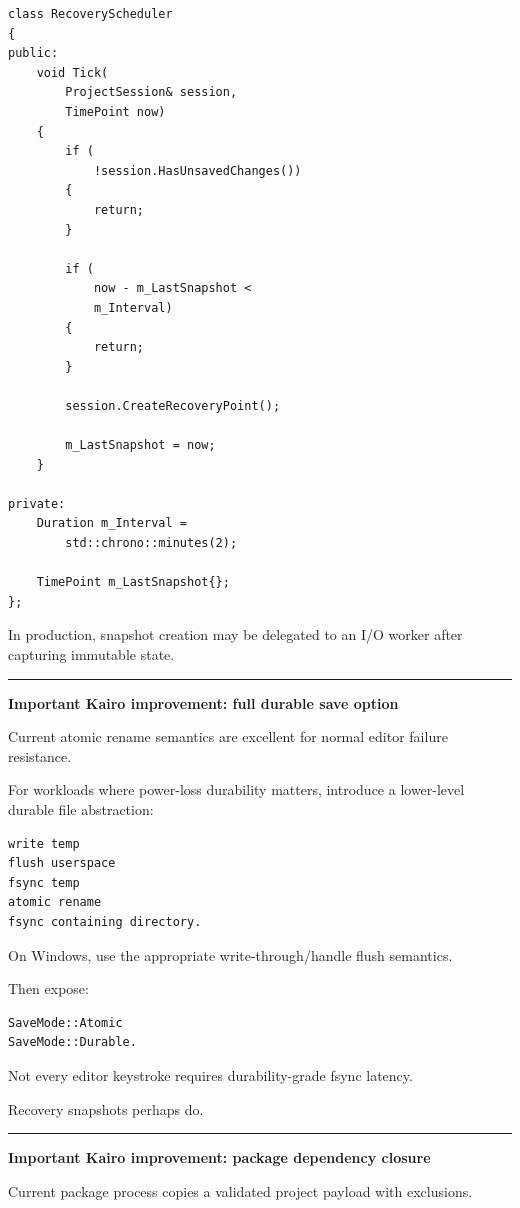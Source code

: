 \begin{verbatim}
class RecoveryScheduler
{
public:
    void Tick(
        ProjectSession& session,
        TimePoint now)
    {
        if (
            !session.HasUnsavedChanges())
        {
            return;
        }

        if (
            now - m_LastSnapshot <
            m_Interval)
        {
            return;
        }

        session.CreateRecoveryPoint();

        m_LastSnapshot = now;
    }

private:
    Duration m_Interval =
        std::chrono::minutes(2);

    TimePoint m_LastSnapshot{};
};
\end{verbatim}

In production, snapshot creation may be delegated to an I/O worker after capturing immutable state.

\begin{center}\rule{0.5\linewidth}{0.5pt}\end{center}

\textbf{Important Kairo improvement: full durable save option}

Current atomic rename semantics are excellent for normal editor failure resistance.

For workloads where power-loss durability matters, introduce a lower-level durable file abstraction:

\begin{verbatim}
write temp
flush userspace
fsync temp
atomic rename
fsync containing directory.
\end{verbatim}

On Windows, use the appropriate write-through/handle flush semantics.

Then expose:

\begin{verbatim}
SaveMode::Atomic
SaveMode::Durable.
\end{verbatim}

Not every editor keystroke requires durability-grade fsync latency.

Recovery snapshots perhaps do.

\begin{center}\rule{0.5\linewidth}{0.5pt}\end{center}

\textbf{Important Kairo improvement: package dependency closure}

Current package process copies a validated project payload with exclusions.

